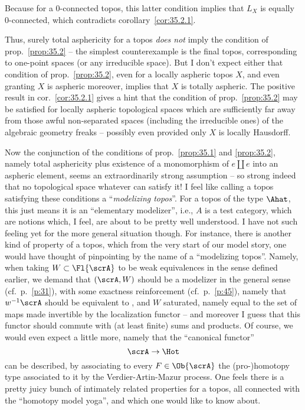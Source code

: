 Because for a 0-connected topos, this latter condition implies that
$L_X$ is equally 0-connected, which contradicts
corollary~\ref{cor:35.2.1}.

Thus, surely total asphericity for a topos \emph{does not} imply
the condition of prop.~\ref{prop:35.2} -- the simplest
counterexample is the final topos, corresponding to one-point
spaces (or any irreducible space). But I don't expect either that condition of
prop.~\ref{prop:35.2}, even for a locally aspheric topos $X$, and even
granting $X$ is aspheric moreover, implies that $X$ is totally
aspheric. The positive result in cor.~\ref{cor:35.2.1} gives a hint
that the condition of prop.~\ref{prop:35.2} may be satisfied for locally
aspheric topological spaces which are sufficiently far away from those
awful non-separated spaces (including the irreducible ones) of the
algebraic geometry freaks -- possibly even provided only $X$ is
locally Hausdorff.

Now the conjunction of the conditions of prop.~\ref{prop:35.1} and
\ref{prop:35.2}, namely total asphericity plus existence of a
monomorphism of $e \amalg e$ into an aspheric element, seems an
extraordinarily strong assumption -- so strong indeed that no
topological space whatever can satisfy it! I feel like calling a topos
satisfying these conditions a ``\emph{modelizing topos}''. For a topos
of the type $\Ahat$, this just means it is an ``elementary
modelizer'', i.e., $A$ is a test category, which are notions which, I
feel, are about to be pretty well understood. I have not such feeling
yet for the more general situation though. For instance, there is
another kind of property of a topos, which from the very start of our
model story, one would have thought of pinpointing by the name of a
``modelizing topos''. Namely, when taking $W \subset\Fl{\scrA}$ to be
weak equivalences in the sense defined earlier, we demand that
$(\scrA,W)$ should be a modelizer in the general sense
(cf.\ p.~\ref{p:31}),
with some exactness reinforcement
(cf.\ p.~\ref{p:45}), namely that
$w^{-1}\scrA$ should be equivalent to \Hot, and $W$ saturated, namely
equal to the set of maps made invertible by the localization functor
-- and moreover I guess that this functor should commute with (at
least finite) sums and products. Of course, we would even expect a
little more, namely that the ``canonical functor''
\[\scrA \to \Hot\]
can be described, by associating to every $F\in\Ob{\scrA}$ the
(pro-)homotopy type associated to it by the Verdier-Artin-Mazur
process. One feels there is a pretty juicy bunch of intimately related
properties for a topos, all connected with the ``homotopy model
yoga'', and which one would like to know about.


